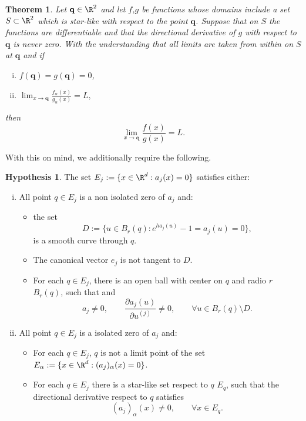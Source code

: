 \documentclass[sort&compress, preprint]{elsarticle}
\theoremstyle{definition}
\newtheorem{hypothesis}{Hypothesis}[section]
\theoremstyle{plain}%
\newtheorem{thm}{Theorem}[section]
\theoremstyle{remark}
\begin{document}
\begin{thm}\label{thm:Fine}
	Let $\mathbf{q}\in \R^2$ and let $f$,$g$ be functions whose domains include a set $S\subset \R^2$ which is 
	star-like 
	with  respect to the point $\mathbf{q}$. Suppose that on $S$ the functions are differentiable and that
	the directional derivative of $g$ with respect to $\mathbf{q}$ is never zero. With the understanding that all 
	limits are taken from within on $S$ at $\mathbf{q}$ and if
	\begin{enumerate}[(i)]
		\item 
			$f(\mathbf{q})=g(\mathbf{q})=0$,
		\item
			$
				\displaystyle
				\lim_{x \to \mathbf{q}}
				\frac{f_{\alpha}(x)}{g_{\alpha}(x)} = L,	
			$
	\end{enumerate}
	then
	$$
		\lim_{x \to \mathbf{q}}
		\frac{f(x)}{g(x)} = L.
	$$
\end{thm}
%
With this on mind, we additionally require the following. 
\begin{hypothesis}\label{ass:HypThmSingularities}
	The set $E_j:=\{x\in \R^{d}: a_j(x)=0\}$ satisfies either:
	\begin{enumerate}[(i)]
		\item
			All point $q \in E_j$ is a non isolated zero of $a_j$ and:
			\begin{itemize}
				\item the set 
					$$
						D:=\{u \in B_r(q): e^{ha_j(u)}-1=a_j(u)= 0\},
					$$ 
					is a smooth curve through $q$. 
				\item
					The canonical vector $e_j$ is not
					tangent to $D$.
				\item
					For each $q \in E_j$, there is an open ball with center
					on $q$ and radio $r$ $B_r(q)$, such that  
					and
					$$
						a_j\neq 0, \qquad
						\frac{\partial a_j(u)}{\partial u^{(j)}} \neq 0 ,\qquad 
						\forall u \in B_r(q)
						\setminus D.
					$$	
			\end{itemize}	
		\item
			All point $q \in E_j$ is a isolated zero of $a_j$ and:
			\begin{itemize}
				\item
					For each $q\in E_j$,  $q$ is not a limit point of the set 
					$E_{\alpha}:=\{x \in \R^d: (a_j)_\alpha(x)=0\}$.
				\item
					For each $q \in E_j$ there is a star-like set respect to $q$ $E_q$, such that
					the directional derivative respect to $q$ satisfies
					$$
						 (a_j)_\alpha(x) \neq 0, \qquad \forall x\in E_q.
					$$
			\end{itemize}		
	\end{enumerate}	
\end{hypothesis}
\end{document}
